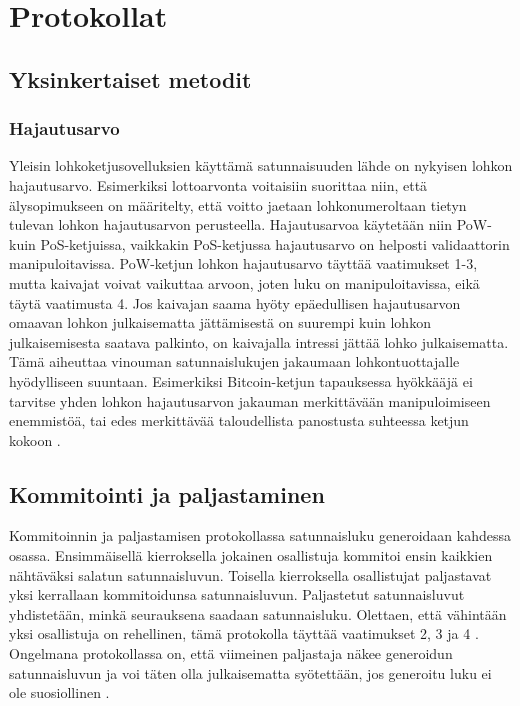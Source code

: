 \chapter{Protokollat\label{results}}
\section{Yksinkertaiset metodit}

\subsection{Hajautusarvo}
Yleisin lohkoketjusovelluksien käyttämä satunnaisuuden lähde on nykyisen lohkon hajautusarvo. Esimerkiksi lottoarvonta voitaisiin suorittaa niin, että älysopimukseen on määritelty, että voitto jaetaan lohkonumeroltaan tietyn tulevan lohkon hajautusarvon perusteella. Hajautusarvoa käytetään niin PoW- kuin PoS-ketjuissa, vaikkakin PoS-ketjussa hajautusarvo on helposti validaattorin manipuloitavissa. PoW-ketjun lohkon hajautusarvo täyttää vaatimukset 1-3, mutta kaivajat voivat vaikuttaa arvoon, joten luku on manipuloitavissa, eikä täytä vaatimusta 4. Jos kaivajan saama hyöty epäedullisen hajautusarvon omaavan lohkon julkaisematta jättämisestä on suurempi kuin lohkon julkaisemisesta saatava palkinto, on kaivajalla intressi jättää lohko julkaisematta. Tämä aiheuttaa vinouman satunnaislukujen jakaumaan lohkontuottajalle hyödylliseen suuntaan. Esimerkiksi Bitcoin-ketjun tapauksessa hyökkääjä ei tarvitse yhden lohkon hajautusarvon jakauman merkittävään manipuloimiseen enemmistöä, tai edes merkittävää taloudellista panostusta suhteessa ketjun kokoon \cite{pierrot_malleability_2018}.

\section{Kommitointi ja paljastaminen}
Kommitoinnin ja paljastamisen protokollassa satunnaisluku generoidaan kahdessa osassa. Ensimmäisellä kierroksella jokainen osallistuja kommitoi ensin kaikkien nähtäväksi salatun satunnaisluvun. Toisella kierroksella osallistujat paljastavat yksi kerrallaan kommitoidunsa satunnaisluvun. Paljastetut satunnaisluvut yhdistetään, minkä seurauksena saadaan satunnaisluku. Olettaen, että vähintään yksi osallistuja on rehellinen, tämä protokolla täyttää vaatimukset 2, 3 ja 4 \cite{simic_review_2020}. Ongelmana protokollassa on, että viimeinen paljastaja näkee generoidun satunnaisluvun ja voi täten olla julkaisematta syötettään, jos generoitu luku ei ole suosiollinen \cite{simic_review_2020}.

